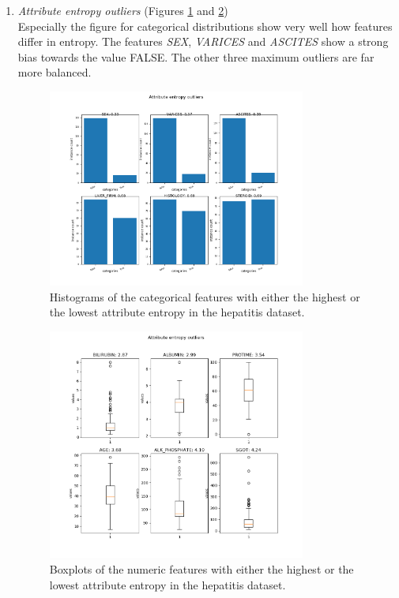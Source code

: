 \documentclass[10pt,a4paper]{report}
\begin{document}
\begin{itemize}
\begin{enumerate}
			\item \textit{Attribute entropy outliers} (Figures \ref{fig:HepAttEntCat} and \ref{fig:HepAttEntNum}) \\
			Especially the figure for categorical distributions show very well how features differ in entropy. The features \textit{SEX}, \textit{VARICES} and \textit{ASCITES} show a strong bias towards the value FALSE. The other three maximum outliers are far more balanced.
			
			\begin{figure}[H]
				\centering
				\includegraphics[width=0.8\textwidth]{Hep_AttEnt_Cat.png}
				\caption{Histograms of the categorical features with either the highest or the lowest attribute entropy in the hepatitis dataset.}
				\label{fig:HepAttEntCat}
			\end{figure}
			
			\begin{figure}[H]
				\centering
				\includegraphics[width=0.8\textwidth]{Hep_AttEnt_Num.png}
				\caption{Boxplots of the numeric features with either the highest or the lowest attribute entropy in the hepatitis dataset.}
				\label{fig:HepAttEntNum}
			\end{figure}
			
		\end{enumerate}
		
	\end{itemize}
	
\end{document}
